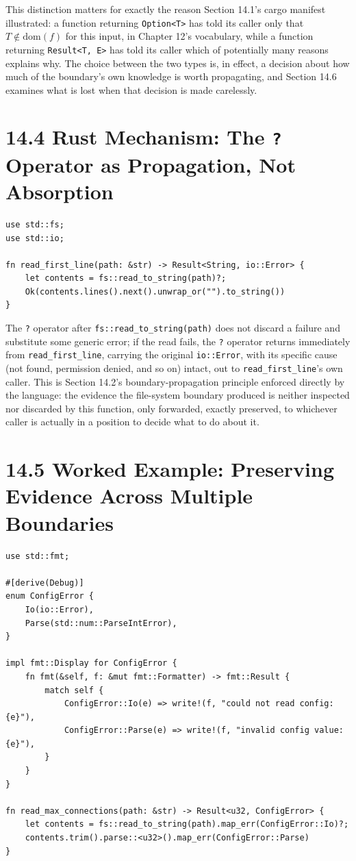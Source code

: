 \documentclass[11pt]{book}
\begin{document}
This distinction matters for exactly the reason Section 14.1's cargo manifest illustrated: a function returning \texttt{Option<T>} has told its caller only that $T \notin \mathrm{dom}(f)$ for this input, in Chapter 12's vocabulary, while a function returning \texttt{Result<T, E>} has told its caller which of potentially many reasons explains why. The choice between the two types is, in effect, a decision about how much of the boundary's own knowledge is worth propagating, and Section 14.6 examines what is lost when that decision is made carelessly.

\section*{14.4 Rust Mechanism: The \texttt{?} Operator as Propagation, Not Absorption}

\begin{lstlisting}
use std::fs;
use std::io;

fn read_first_line(path: &str) -> Result<String, io::Error> {
    let contents = fs::read_to_string(path)?;
    Ok(contents.lines().next().unwrap_or("").to_string())
}
\end{lstlisting}

The \texttt{?} operator after \texttt{fs::read\_to\_string(path)} does not discard a failure and substitute some generic error; if the read fails, the \texttt{?} operator returns immediately from \texttt{read\_first\_line}, carrying the original \texttt{io::Error}, with its specific cause (not found, permission denied, and so on) intact, out to \texttt{read\_first\_line}'s own caller. This is Section 14.2's boundary-propagation principle enforced directly by the language: the evidence the file-system boundary produced is neither inspected nor discarded by this function, only forwarded, exactly preserved, to whichever caller is actually in a position to decide what to do about it.

\section*{14.5 Worked Example: Preserving Evidence Across Multiple Boundaries}

\begin{lstlisting}
use std::fmt;

#[derive(Debug)]
enum ConfigError {
    Io(io::Error),
    Parse(std::num::ParseIntError),
}

impl fmt::Display for ConfigError {
    fn fmt(&self, f: &mut fmt::Formatter) -> fmt::Result {
        match self {
            ConfigError::Io(e) => write!(f, "could not read config: {e}"),
            ConfigError::Parse(e) => write!(f, "invalid config value: {e}"),
        }
    }
}

fn read_max_connections(path: &str) -> Result<u32, ConfigError> {
    let contents = fs::read_to_string(path).map_err(ConfigError::Io)?;
    contents.trim().parse::<u32>().map_err(ConfigError::Parse)
}
\end{lstlisting}
\end{document}
